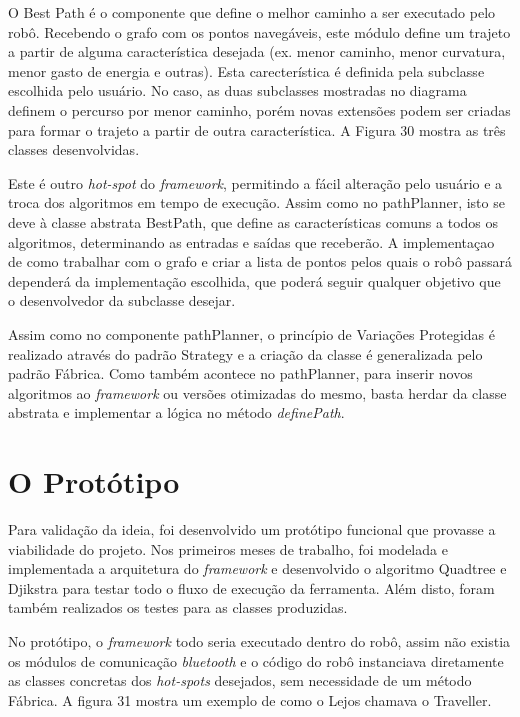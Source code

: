 O Best Path é o componente que define o melhor caminho a ser executado pelo robô. Recebendo o grafo com os pontos navegáveis, este módulo define um trajeto a partir de alguma característica desejada (ex. menor caminho, menor curvatura, menor gasto de energia e outras). Esta carecterística é definida pela subclasse escolhida pelo usuário. No caso, as duas subclasses mostradas no diagrama definem o percurso por menor caminho, porém novas extensões podem ser criadas para formar o trajeto a partir de outra característica. A Figura 30 mostra as três classes desenvolvidas.

Este é outro \textit{hot-spot} do \textit{framework}, permitindo a fácil alteração pelo usuário e a troca dos algoritmos em tempo de execução. Assim como no pathPlanner, isto se deve à classe abstrata BestPath, que define as características comuns a todos os algoritmos, determinando as entradas e saídas que receberão. A implementaçao de como trabalhar com o grafo e criar a lista de pontos pelos quais o robô passará dependerá da implementação escolhida, que poderá seguir qualquer objetivo que o desenvolvedor da subclasse desejar.

Assim como no componente pathPlanner, o princípio de Variações Protegidas é realizado através do padrão Strategy e a criação da classe é generalizada pelo padrão Fábrica. Como também acontece no pathPlanner, para inserir novos algoritmos ao \textit{framework} ou versões otimizadas do mesmo, basta herdar da classe abstrata e implementar a lógica no método \textit{definePath}.

\section{O Protótipo}

Para validação da ideia, foi desenvolvido um protótipo funcional que provasse a viabilidade do projeto. Nos primeiros meses de trabalho, foi modelada e implementada a arquitetura do \textit{framework} e desenvolvido o algoritmo Quadtree e Djikstra para testar todo o fluxo de execução da ferramenta. Além disto, foram também realizados os testes para as classes produzidas.

No protótipo, o \textit{framework} todo seria executado dentro do robô, assim não existia os módulos de comunicação \textit{bluetooth} e o código do robô instanciava diretamente as classes concretas dos \textit{hot-spots} desejados, sem necessidade de um método Fábrica. A figura 31 mostra um exemplo de como o Lejos chamava o Traveller.

